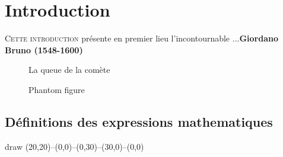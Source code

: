 \documentclass[12pt,a4paper,twocolumn]{book} %
\title{\thispagestyle{fancy}\flushleft{\HAMA{0010111} GÉOMÉTROGRAPHIE avec  \LaTeX{}}}
\date{}
\begin{document}
\maketitle









\chapter{Introduction}
\thispagestyle{fancy}
\lettrine{C}{ette introduction} présente en premier lieu l'incontournable ...\textbf{Giordano Bruno (1548-1600)}


\begin{figure}[t]
\caption[La taille des planètes]{La queue de la comète\label{billetcomete}}
\end{figure}
\begin{figure}[ht]
    \centering
    \shadowbox{\phantom{\rule{4cm}{3cm}}}
    \caption{Phantom figure}
  \end{figure}
  
\section{Définitions des expressions mathematiques}


\begin{mpinline}
draw (20,20)--(0,0)--(0,30)--(30,0)--(0,0)
\end{mpinline}
\end{document}
